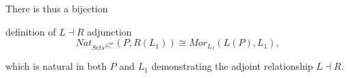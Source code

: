 \begin{frame}
There is thus a bijection
\begin{block}{definition of $L \dashv R$ adjunction}
$$
Nat_{\textit{Sets}^{\mathcal{L}_0^{opp}}} (P,R(L_1)) \cong Mor_{L_1}(L(P),L_1),
$$
\end{block}
which is natural in both $P$ and $L_1$ demonstrating the adjoint relationship $L \dashv R$.
\end{frame}